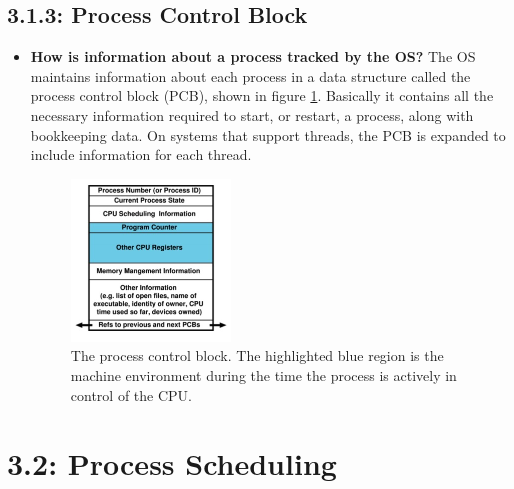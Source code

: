 \documentclass[12pt]{article}
\begin{document}
\subsection*{3.1.3: Process Control Block}

\begin{itemize}
    \item \textbf{How is information about a process tracked by the OS?} The OS maintains information about each process in a data structure called the process control block (PCB), shown in figure \ref{fig:process-control-block}. Basically it contains all the necessary information required to start, or restart, a process, along with bookkeeping data. On systems that support threads, the PCB is expanded to include information for each thread.
    \begin{figure}[ht]
        \centering
        \includegraphics[width=0.4\textwidth]{figures/process-control-block.jpg}
        \caption{The process control block. The highlighted blue region is the machine environment during the time the process is actively in control of the CPU.}
        \label{fig:process-control-block}
    \end{figure}
\end{itemize}

\section*{3.2: Process Scheduling}
\end{document}
